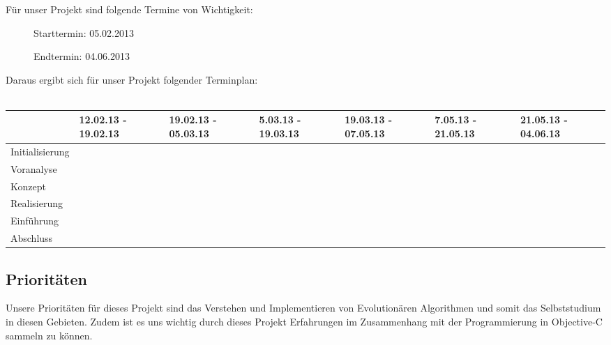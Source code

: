 	Für unser Projekt sind folgende Termine von Wichtigkeit:
	\begin{description}
		\item[] Starttermin: 05.02.2013
		\item[] Endtermin: 04.06.2013
	\end{description}
	Daraus ergibt sich für unser Projekt folgender Terminplan:
	\\ \\
	\tiny{
	\begin{tabular}{| p{2cm} | p{1cm} | p{1cm} | p{1cm} | p{1cm} | p{1cm} | p{1cm} |}
	\hline
	\rowcolor[gray]{0.9}  & 12.02.13 - 19.02.13 & 19.02.13 - 05.03.13 & 5.03.13 - 19.03.13 & 19.03.13 - 07.05.13 & 7.05.13 - 21.05.13 & 21.05.13 - 04.06.13 \\
	\hline
	Initialisierung & \cellcolor{yellow} & & & & & \\
	\hline
	Voranalyse & &  \cellcolor{yellow}& & & & \\
	\hline
	Konzept & & &  \cellcolor{yellow}& & & \\
	\hline
	Realisierung & & & &  \cellcolor{yellow}& & \\
	\hline
	Einführung & & & & & \cellcolor{yellow}& \\
	\hline
	Abschluss & & & & &  &\cellcolor{yellow} \\
	\hline
	\end{tabular}	
	}
	\small{
	\subsection{Prioritäten}
	Unsere Prioritäten für dieses Projekt sind das Verstehen und Implementieren von Evolutionären Algorithmen und somit das Selbststudium in diesen Gebieten. Zudem ist es uns wichtig durch dieses Projekt Erfahrungen im Zusammenhang mit der Programmierung in Objective-C sammeln zu können. 
}
